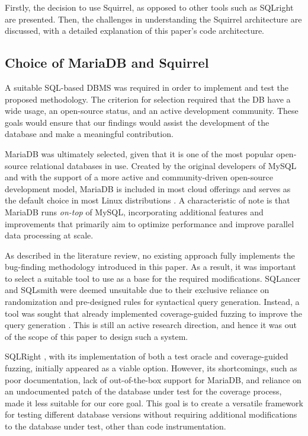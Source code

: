 \documentclass[sigconf]{acmart}
\begin{document}
Firstly, the decision to use Squirrel, as opposed to other tools such as SQLright are presented. Then, the challenges in understanding the Squirrel architecture are discussed, with a detailed explanation of this paper's code architecture.

\subsection{Choice of MariaDB and Squirrel}

A suitable SQL-based DBMS was required in order to implement and test the proposed methodology. The criterion for selection required that the DB have a wide usage, an open-source status, and an active development community. These goals would ensure that our findings would assist the development of the database and make a meaningful contribution.

MariaDB was ultimately selected, given that it is one of the most popular open-source relational databases in use. Created by the original developers of MySQL and with the support of a more active and community-driven open-source development model, MariaDB is included in most cloud offerings and serves as the default choice in most Linux distributions \cite{mariadb}. A characteristic of note is that MariaDB runs \textit{on-top} of MySQL, incorporating additional features and improvements that primarily aim to optimize performance and improve parallel data processing at scale.

As described in the literature review, no existing approach fully implements the bug-finding methodology introduced in this paper. As a result, it was important to select a suitable tool to use as a base for the required modifications. SQLancer and SQLsmith were deemed unsuitable due to their exclusive reliance on randomization and pre-designed rules for syntactical query generation. Instead, a tool was sought that already implemented coverage-guided fuzzing to improve the query generation \cite{zhong2020squirrel}. This is still an active research direction, and hence it was out of the scope of this paper to design such a system.

SQLRight \cite{liang2022detecting}, with its implementation of both a test oracle and coverage-guided fuzzing, initially appeared as a viable option. However, its shortcomings, such as poor documentation, lack of out-of-the-box support for MariaDB, and reliance on an undocumented patch of the database under test for the coverage process, made it less suitable for our core goal. This goal is to create a versatile framework for testing different database versions without requiring additional modifications to the database under test, other than code instrumentation.
\end{document}
